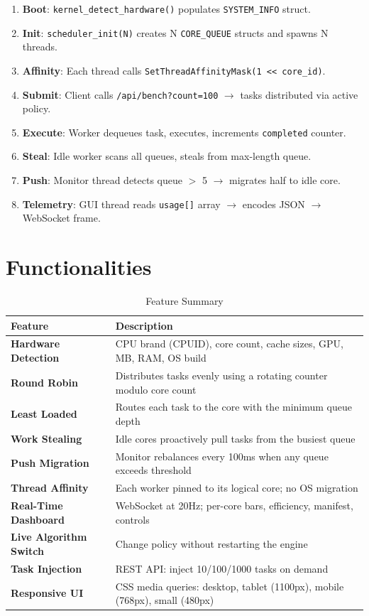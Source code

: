 \documentclass[12pt,a4paper]{article}
\begin{document}
\begin{enumerate}
  \item \textbf{Boot}: \texttt{kernel\_detect\_hardware()} populates \texttt{SYSTEM\_INFO} struct.
  \item \textbf{Init}: \texttt{scheduler\_init(N)} creates N \texttt{CORE\_QUEUE} structs and spawns N threads.
  \item \textbf{Affinity}: Each thread calls \texttt{SetThreadAffinityMask(1 << core\_id)}.
  \item \textbf{Submit}: Client calls \texttt{/api/bench?count=100} $\rightarrow$ tasks distributed via active policy.
  \item \textbf{Execute}: Worker dequeues task, executes, increments \texttt{completed} counter.
  \item \textbf{Steal}: Idle worker scans all queues, steals from max-length queue.
  \item \textbf{Push}: Monitor thread detects queue $>$ 5 $\rightarrow$ migrates half to idle core.
  \item \textbf{Telemetry}: GUI thread reads \texttt{usage[]} array $\rightarrow$ encodes JSON $\rightarrow$ WebSocket frame.
\end{enumerate}

\section{Functionalities}

\begin{table}[H]
\centering
\begin{tabular}{>{\bfseries}p{4cm} p{9cm}}
\toprule
Feature & Description \\
\midrule
Hardware Detection   & CPU brand (CPUID), core count, cache sizes, GPU, MB, RAM, OS build \\
Round Robin          & Distributes tasks evenly using a rotating counter modulo core count \\
Least Loaded         & Routes each task to the core with the minimum queue depth \\
Work Stealing        & Idle cores proactively pull tasks from the busiest queue \\
Push Migration       & Monitor rebalances every 100ms when any queue exceeds threshold \\
Thread Affinity      & Each worker pinned to its logical core; no OS migration \\
Real-Time Dashboard  & WebSocket at 20Hz; per-core bars, efficiency, manifest, controls \\
Live Algorithm Switch& Change policy without restarting the engine \\
Task Injection       & REST API: inject 10/100/1000 tasks on demand \\
Responsive UI        & CSS media queries: desktop, tablet (1100px), mobile (768px), small (480px) \\
\bottomrule
\end{tabular}
\caption{Feature Summary}
\end{table}
\end{document}
